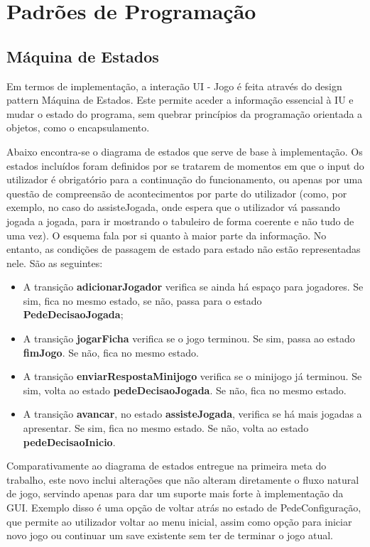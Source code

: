 \documentclass[11pt]{article}
\begin{document}
	\pagebreak
	
	\large
	\section{Padrões de Programação}
	\subsection{Máquina de Estados}
	\normalsize
	
	 Em termos de implementação, a interação UI - Jogo é feita através do design pattern Máquina de Estados. Este permite aceder a informação essencial à IU e mudar o estado do programa, sem quebrar princípios da programação orientada a objetos, como o encapsulamento.
	 
	 Abaixo encontra-se o diagrama de estados que serve de base à implementação. Os estados incluídos foram definidos por se tratarem de momentos em que o input do utilizador é obrigatório para a continuação do funcionamento, ou apenas por uma questão de compreensão de acontecimentos por parte do utilizador (como, por exemplo, no caso do assisteJogada, onde espera que o utilizador vá passando jogada a jogada, para ir mostrando o tabuleiro de forma coerente e não tudo de uma vez). O esquema fala por si quanto à maior parte da informação. No entanto, as condições de passagem de estado para estado não estão representadas nele. São as seguintes:
	 
	 \begin{itemize}
	 	\item A transição \textbf{adicionarJogador} verifica se ainda há espaço para jogadores. Se sim, fica no mesmo estado, se não, passa para o estado \textbf{PedeDecisaoJogada};
	 	\item A transição \textbf{jogarFicha} verifica se o jogo terminou. Se sim, passa ao estado \textbf{fimJogo}. Se não, fica no mesmo estado.
	 	\item A transição \textbf{enviarRespostaMinijogo} verifica se o minijogo já terminou. Se sim, volta ao estado \textbf{pedeDecisaoJogada}. Se não, fica no mesmo estado.
	 	\item A transição \textbf{avancar}, no estado \textbf{assisteJogada}, verifica se há mais jogadas a apresentar. Se sim, fica no mesmo estado. Se não, volta ao estado \textbf{pedeDecisaoInicio}.
	 \end{itemize}
 
 	Comparativamente ao diagrama de estados entregue na primeira meta do trabalho, este novo inclui alterações que não alteram diretamente o fluxo natural de jogo, servindo apenas para dar um suporte mais forte à implementação da GUI. Exemplo disso é uma opção de voltar atrás no estado de PedeConfiguração, que permite ao utilizador voltar ao menu inicial, assim como opção para iniciar novo jogo ou continuar um save existente sem ter de terminar o jogo atual.
	 
\end{document}
